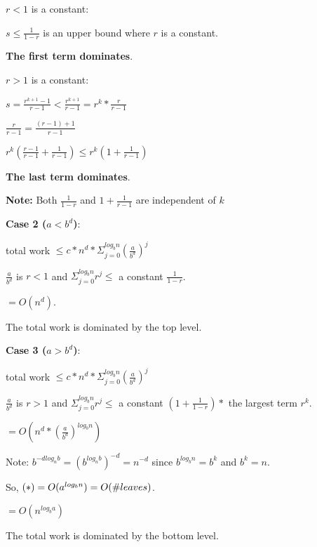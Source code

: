 \documentclass[11pt]{article}
\newenvironment{aside}
  {\begin{mdframed}[style=0,%
      leftline=false,rightline=false,leftmargin=2em,rightmargin=2em,%
          innerleftmargin=0pt,innerrightmargin=0pt,linewidth=0.75pt,%
      skipabove=7pt,skipbelow=7pt]\small}
  {\end{mdframed}}
\begin{document}
$r < 1$ is a constant:

\vspace{11pt}
\begin{center}
   $s \leq \frac{1}{1-r}$ is an upper bound where $r$ is a constant.

  \textbf{The first term dominates}.
\end{center}
\vspace{11pt}

$r > 1$ is a constant:

\vspace{11pt}
\begin{center}
    $s=\frac{r^{k+1}-1}{r-1} < \frac{r^{k+1}}{r-1} = r^k*\frac{r}{r-1}$

    $\frac{r}{r-1} = \frac{(r-1)+1}{r-1}$

    $r^k(\frac{r-1}{r-1}+\frac{1}{r-1}) \leq r^k(1+\frac{1}{r-1})$
    
    \textbf{The last term dominates}.
\end{center}
\vspace{11pt}

\begin{aside}
    \textbf{Note:} Both $\frac{1}{1-r}$ and $1+\frac{1}{r-1}$ are independent of $k$
\end{aside}
\vspace{11pt}

\textbf{Case 2 ($a < b^d$)}:

\vspace{11pt}
\begin{center}
    total work $\leq c*n^d*\Sigma_{j=0}^{log_bn}(\frac{a}{b^d})^j$

    $\frac{a}{b^d}$ is $r < 1$ and $\Sigma_{j=0}^{log_bn}r^j \leq$ a constant $\frac{1}{1-r}$.

    $=O(n^d)$.

    The total work is dominated by the top level.
\end{center}
\vspace{11pt}

\textbf{Case 3 ($a > b^d$)}:

\vspace{11pt}
\begin{center}
    total work $\leq c*n^d*\Sigma_{j=0}^{log_bn}(\frac{a}{b^d})^j$

    $\frac{a}{b^d}$ is $r > 1$ and $\Sigma_{j=0}^{log_bn}r^j \leq$ a constant $(1+\frac{1}{1-r}) * $ the largest term $r^k$.

    $=O(n^d*(\frac{a}{b^d})^{log_bn})$

    Note: $b^{-dlog_nb} = (b^{log_nb})^{-d}=n^{-d}$ since $b^{log_bn}=b^k$ and $b^k=n$.

    So, $(*) =O(a^{log_bn}) = O(\# \space leaves)$.

    $=O(n^{log_ba})$

    The total work is dominated by the bottom level.
\end{center}
\vspace{11pt}
\end{document}
